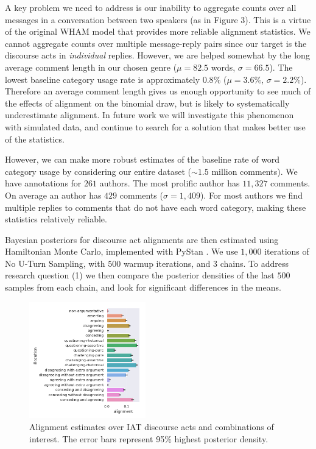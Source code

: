 \documentclass[11pt,a4paper]{article}
\begin{document}
A key problem we need to address is our inability to aggregate counts over all messages in a conversation between two speakers (as in Figure 3). This is a virtue of the original WHAM model that provides more reliable alignment statistics. We cannot aggregate counts over multiple message-reply pairs since our target is the discourse acts in \textit{individual} replies. However, we are helped somewhat by the long average comment length in our chosen genre ($\mu = 82.5$ words, $\sigma = 66.5$). The lowest baseline category usage rate is approximately $0.8\%$ ($\mu = 3.6\%$, $\sigma = 2.2\%$). Therefore an average comment length gives us enough opportunity to see much of the effects of alignment on the binomial draw, but is likely to systematically underestimate alignment. In future work we will investigate this phenomenon with simulated data, and continue to search for a solution that makes better use of the statistics.

However, we can make more robust estimates of the baseline rate of word category usage by considering our entire dataset ($\sim 1.5$ million comments). We have annotations for $261$ authors. The most prolific author has $11,327$ comments. On average an author has $429$ comments ($\sigma = 1,409$). For most authors we find multiple replies to comments that do not have each word category, making these statistics relatively reliable.

Bayesian posteriors for discourse act alignments are then estimated using Hamiltonian Monte Carlo, implemented with PyStan \cite{CarpenterGHLGBBGLR17}. We use $1,000$ iterations of No U-Turn Sampling, with $500$ warmup iterations, and $3$ chains. To address research question (1) we then compare the posterior densities of the last $500$ samples from each chain, and look for significant differences in the means.

\begin{figure}[t]
\centering
\includegraphics[width=0.45\textwidth]{alignment.png}
\caption{Alignment estimates over IAT discourse acts and combinations of interest. The error bars represent 95\% highest posterior density.}
\end{figure}
\end{document}
